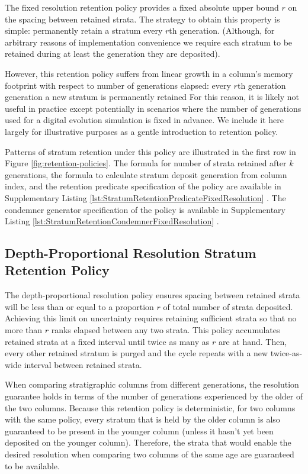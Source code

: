 The fixed resolution retention policy provides a fixed absolute upper bound $r$ on the spacing between retained strata.
The strategy to obtain this property is simple: permanently retain a stratum every $r$th generation.
(Although, for arbitrary reasons of implementation convenience we require each stratum to be retained during at least the generation they are deposited).

However, this retention policy suffers from linear growth in a column's memory footprint with respect to number of generations elapsed: every $r$th generation generation a new stratum is permanently retained
For this reason, it is likely not useful in practice except potentially in scenarios where the number of generations used for a digital evolution simulation is fixed in advance.
We include it here largely for illustrative purposes as a gentle introduction to retention policy.

Patterns of stratum retention under this policy are illustrated in the first row in Figure \ref{fig:retention-policies}.
The formula for number of strata retained after $k$ generations, the formula to calculate stratum deposit generation from column index, and the retention predicate specification of the policy are available in Supplementary Listing \ref{lst:StratumRetentionPredicateFixedResolution} \citep{moreno2022hstratconceptsupplement}.
The condemner generator specification of the policy is available in Supplementary Listing \ref{lst:StratumRetentionCondemnerFixedResolution} \citep{moreno2022hstratconceptsupplement}.

\subsection{Depth-Proportional Resolution Stratum Retention Policy}

The depth-proportional resolution policy ensures spacing between retained strata will be less than or equal to a proportion $r$ of total number of strata deposited.
Achieving this limit on uncertainty requires retaining sufficient strata so that no more than $r$ ranks elapsed between any two strata.
This policy accumulates retained strata at a fixed interval until twice as many as $r$ are at hand.
Then, every other retained stratum is purged and the cycle repeats with a new twice-as-wide interval between retained strata.

When comparing stratigraphic columns from different generations, the resolution guarantee holds in terms of the number of generations experienced by the older of the two columns.
Because this retention policy is deterministic, for two columns with the same policy, every stratum that is held by the older column is also guaranteed to be present in the younger column (unless it hasn't yet been deposited on the younger column).
Therefore, the strata that would enable the desired resolution when comparing two columns of the same age are guaranteed to be available.

